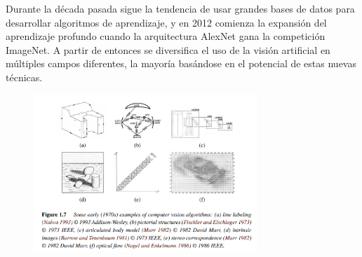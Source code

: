 \vspace{\baselineskip}

Durante la década pasada sigue la tendencia de usar grandes bases de datos para desarrollar algoritmos de aprendizaje, y en 2012 comienza la expansión del aprendizaje profundo cuando la arquitectura AlexNet gana la competición ImageNet. A partir de entonces se diversifica el uso de la visión artificial en múltiples campos diferentes, la mayoría basándose en el potencial de estas nuevas técnicas.









\begin{figure}[H]
    \centerfloat
    \includegraphics[width=0.75\textwidth]{img/70s.png}
\end{figure}

